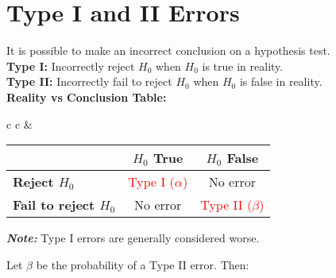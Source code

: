\section*{Type I and II Errors}

It is possible to make an incorrect conclusion on a hypothesis test. \\

\textbf{Type I:} Incorrectly reject $H_0$ when $H_0$ is true in reality. \\
\textbf{Type II:} Incorrectly fail to reject $H_0$ when $H_0$ is false in reality. \\


\noindent \textbf{Reality vs Conclusion Table:}
\vspace{1em}
\begin{center}
\small
\renewcommand{\arraystretch}{1.8}
\setlength{\tabcolsep}{1.5em}


\vspace{0.5em}

\begin{tabular}{c c}
\hspace*{2em} &
\begin{tabular}{|l|c|c|}
\hline
& $H_0$ True & $H_0$ False \\
\hline
\textbf{Reject $H_0$} & \textcolor{red}{Type I ($\alpha$)} & \textcolor{green!50!black}{No error \checkmark} \\
\hline
\textbf{Fail to reject $H_0$} & \textcolor{green!50!black}{No error \checkmark} & \textcolor{red}{Type II ($\beta$)} \\
\hline
\end{tabular}
\end{tabular}
\end{center}



\vspace{1em}
\textbf{\textit{Note:}} Type I errors are generally considered worse.

\vspace{0.5em}
\noindent Let $\beta$ be the probability of a Type II error. Then:


